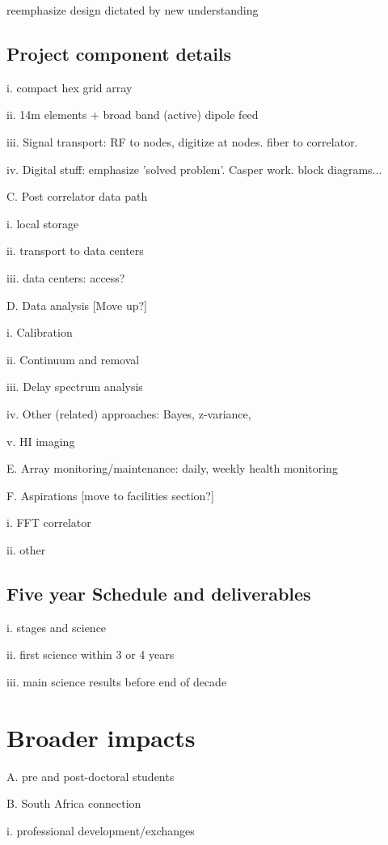 \documentclass[preprint]{aastex}
\begin{document}
reemphasize design dictated by new understanding

\subsection{Project component details}  %

i. compact hex grid array

ii. 14m elements + broad band (active) dipole feed

iii. Signal transport: RF to nodes, digitize at nodes. fiber to correlator. 

iv. Digital stuff: emphasize 'solved problem'. Casper work. block diagrams...

C. Post correlator data path

i. local storage

ii. transport to data centers

iii. data centers: access? 

D. Data analysis [Move up?]

i. Calibration 

ii. Continuum and removal

iii. Delay spectrum analysis

iv. Other (related) approaches: Bayes, z-variance,

v. HI imaging

E. Array monitoring/maintenance: daily, weekly health monitoring

F. Aspirations [move to facilities section?]

i. FFT correlator

ii. other

\subsection{Five year Schedule and deliverables} %

i. stages and science

ii. first science within 3 or 4 years

iii. main science results before end of decade


\section{Broader impacts} %

A. pre and post-doctoral students

B. South Africa connection

i. professional development/exchanges
\end{document}
